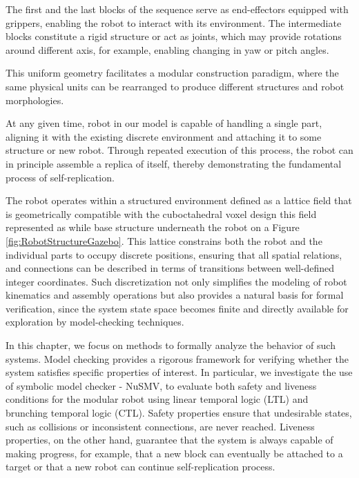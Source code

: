 The first and the last blocks of the sequence serve as end-effectors equipped with 
grippers, enabling the robot to interact with its environment. The intermediate 
blocks constitute a rigid structure or act as joints, which may provide rotations 
around different axis, for example, enabling changing in yaw or pitch angles. 

This uniform geometry facilitates a modular construction paradigm, 
where the same physical units can be rearranged to produce different structures and
robot morphologies.

At any given time, robot in our model is capable of handling a single part, 
aligning it with the existing discrete environment and attaching it to some structure 
or new robot. 
Through repeated execution of this process, the robot can in principle assemble a 
replica of itself, thereby demonstrating the fundamental process of self-replication. 

The robot operates within a structured environment defined as a lattice 
field that is geometrically compatible with the cuboctahedral voxel design 
this field represented as while base structure underneath the robot 
on a Figure \ref{fig:RobotStructureGazebo}. 
This lattice  constrains both the robot and the individual 
parts to occupy discrete positions, ensuring that all spatial 
relations, and connections can be described in terms of 
transitions between well-defined integer coordinates. 
Such discretization not only simplifies the modeling of robot kinematics 
and assembly operations but also provides a natural basis for formal verification, 
since the system state space becomes finite and directly available for 
exploration by model-checking techniques.

In this chapter, we focus on methods to formally analyze the behavior of 
such systems. Model checking provides a rigorous framework for verifying 
whether the system satisfies specific properties of interest. In particular, 
we investigate the use of symbolic model checker - NuSMV, to evaluate 
both safety and liveness conditions for the modular robot using linear temporal logic (LTL)
and brunching temporal logic (CTL). 
Safety properties ensure that undesirable states, such as collisions or 
inconsistent connections, are never reached. 
Liveness properties, on the other hand, guarantee that the system is always capable of making 
progress, for example, that a new block can eventually be attached to 
a target or that a new robot can continue self-replication process.

